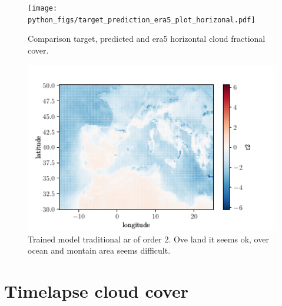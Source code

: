 \begin{figure}[ht]
    \centering
    \texttt{[image: python\_figs/target\_prediction\_era5\_plot\_horizonal.pdf]}
    \caption{Comparison target, predicted and era5 horizontal cloud fractional cover.}
    \label{fig:target_predict_era5_vertical}
\end{figure}

\begin{figure}[ht]
    \centering
    \includegraphics{python_figs/test_traditional_ar_r2.png}
    \caption{Trained model traditional ar of order 2. Ove land it seems ok, over ocean and montain area seems difficult.}
    \label{fig:traditional_ar_model_order_1}
\end{figure}



\cleardoublepage


\chapter{Timelapse cloud cover}

